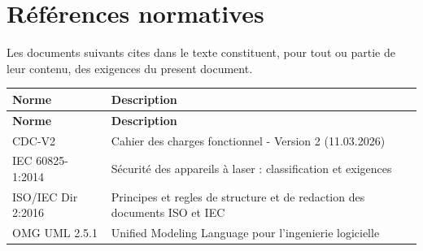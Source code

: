 \section*{Références normatives}

Les documents suivants cites dans le texte constituent, pour tout ou partie de leur contenu,
des exigences du present document.

\begin{longtable}{@{}p{4.2cm}p{10cm}@{}}
\toprule
\textbf{Norme} & \textbf{Description} \\
\midrule
\endfirsthead
\toprule
\textbf{Norme} & \textbf{Description} \\
\midrule
\endhead
CDC-V2 & Cahier des charges fonctionnel - Version 2 (11.03.2026) \\
IEC 60825-1:2014 & Sécurité des appareils à laser : classification et exigences \\
ISO/IEC Dir 2:2016 & Principes et regles de structure et de redaction des documents ISO et IEC \\
OMG UML 2.5.1 & Unified Modeling Language pour l'ingenierie logicielle \\
\bottomrule
\end{longtable}
